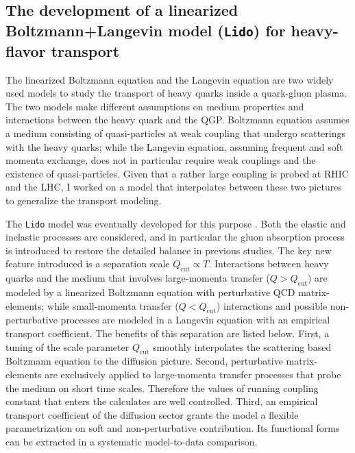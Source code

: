 \documentclass[10pt,a4paper]{article}
\begin{document}
\subsection{The development of a linearized Boltzmann+Langevin model ({\tt Lido}) for heavy-flavor transport}

The linearized Boltzmann equation and the Langevin equation are two widely  used models to study the transport of heavy quarks inside a quark-gluon plasma.
The two models make different assumptions on medium properties and interactions between the heavy quark and the QGP.
Boltzmann equation assumes a medium consisting of quasi-particles at weak coupling that undergo scatterings with the heavy quarks; while the Langevin equation, assuming frequent and soft momenta exchange, does not in particular require weak couplings and the existence of quasi-particles.
Given that a rather large coupling is probed at RHIC and the LHC, I worked on a model that interpolates between these two pictures to generalize the transport modeling.

The {\tt Lido} model was eventually developed for this purpose \cite{Ke:2018tsh, Ke:2018jem}. Both the elastic and inelastic processes are considered, and in particular the gluon absorption process is introduced to restore the detailed balance in previous studies.
The key new feature introduced is a separation scale $Q_{\textrm{cut}}\propto T$. Interactions between heavy quarks and the medium that involves large-momenta transfer ($Q > Q_{\textrm{cut}}$) are modeled by a linearized Boltzmann equation with perturbative QCD matrix-elements;  while small-momenta transfer ($Q < Q_{\textrm{cut}}$) interactions and possible non-perturbative processes are modeled in a Langevin equation with an empirical transport coefficient. The benefits of this separation are listed below. First, a tuning of the scale parameter $Q_{\textrm{cut}}$ smoothly interpolates the scattering based Boltzmann equation to the diffusion picture. Second, perturbative matrix-elements are exclusively applied to large-momenta transfer processes that probe the medium on short time scales. Therefore the values of running coupling constant that enters the calculates are well controlled. Third, an empirical transport coefficient of the diffusion sector grants the model a flexible parametrization on soft and non-perturbative contribution. Its functional forms can be extracted in a systematic model-to-data comparison.
\end{document}
